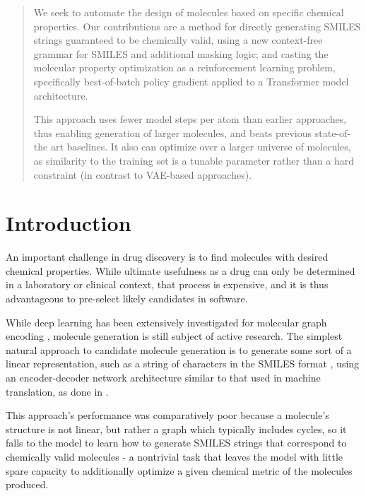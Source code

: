 \documentclass{article}
\begin{document}
\begin{abstract}
We seek to automate the design of molecules based on specific chemical properties. Our contributions are a method for directly generating SMILES strings guaranteed to be chemically valid, using a new context-free grammar for SMILES and additional masking logic; and casting the molecular property optimization as a reinforcement learning problem, specifically best-of-batch policy gradient applied to a Transformer model architecture.

This approach uses fewer model steps per atom than earlier approaches, thus enabling generation of larger molecules, and beats previous state-of-the art baselines. It also can optimize over a larger universe of molecules, as similarity to the training set is a tunable parameter rather than a hard constraint (in contrast to VAE-based approaches).%

\end{abstract}
\section{Introduction}
An important challenge in drug discovery is to find molecules with desired chemical properties. While ultimate usefulness as a drug can only be determined in a laboratory or clinical context, that process is expensive, and it is thus advantageous to pre-select likely candidates in software. 

While deep learning has been extensively investigated for molecular graph encoding \cite{Duvenaud15,Kearnes16,Gilmer17}, molecule generation is still subject of active research. The simplest natural approach to candidate molecule generation is to generate some sort of a linear representation, such as a string of characters in the SMILES format \cite{Weininger88}, using an encoder-decoder network architecture similar to that used in machine translation, as done in \cite{Gomez-Bombarelli16}.

This approach's performance was comparatively poor because a molecule's structure is not linear, but rather a graph which typically includes cycles, so it falls to the model to learn how to generate SMILES strings that correspond to chemically valid molecules - a nontrivial task that leaves the model with little spare capacity to additionally optimize a given chemical metric of the molecules produced.
\end{document}
